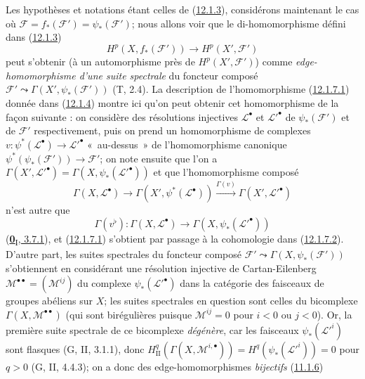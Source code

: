 \begin{env}[12.1.7]
\label{0.12.1.7-fr}
Les hypothèses et notations étant celles de
(\hyperref[0.12.1.3-fr]{12.1.3}), considérons maintenant le cas où
$\mathcal F=f_*(\mathcal F')=\psi_*(\mathcal F')$; nous allons voir que le
di-homomorphisme défini dans (\hyperref[0.12.1.3-fr]{12.1.3})
\[
\label{0.12.1.7.1-fr}
\tag{12.1.7.1}
H^p(X,f_*(\mathcal F'))\longrightarrow H^p(X',\mathcal F')
\]
peut s'obtenir (à un automorphisme près de $H^p(X',\mathcal F')$) comme
\emph{edge-homomorphisme d'une suite spectrale} du foncteur composé
$\mathcal F'\leadsto\Gamma(X',\psi_*(\mathcal F'))$ (T, 2.4). La description
de l'homomorphisme (\hyperref[0.12.1.7.1-fr]{12.1.7.1}) donnée dans
(\hyperref[0.12.1.4-fr]{12.1.4}) montre ici qu'on peut obtenir cet
homomorphisme de la façon suivante : on considère des résolutions injectives
$\mathcal L^\bullet$ et $\mathcal L'^\bullet$ de $\psi_*(\mathcal F')$ et de
$\mathcal F'$ respectivement, puis on prend un homomorphisme de complexes
$v:\psi^*(\mathcal L^\bullet)\to\mathcal L'^\bullet$ «~au-dessus~» de
l'homomorphisme canonique $\psi^*(\psi_*(\mathcal F'))\to\mathcal F'$;
on note ensuite que l'on a
$\Gamma(X',\mathcal L'^\bullet)=\Gamma(X,\psi_*(\mathcal L'^\bullet))$ et
que l'homomorphisme composé
\[
\Gamma(X,\mathcal L^\bullet)\longrightarrow
\Gamma(X',\psi^*(\mathcal L^\bullet))
\xrightarrow{\Gamma(v)}\Gamma(X',\mathcal L'^\bullet)
\]
n'est autre que
\[
\label{0.12.1.7.2-fr}
\tag{12.1.7.2}
\Gamma(v^\flat):\Gamma(X,\mathcal L^\bullet)
\longrightarrow\Gamma(X,\psi_*(\mathcal L'^\bullet))
\]
(\hyperref[0.3.7.1-fr]{\textbf{0}\textsubscript{I}, 3.7.1}), et
(\hyperref[0.12.1.7.1-fr]{12.1.7.1}) s'obtient par passage à la cohomologie
dans (\hyperref[0.12.1.7.2-fr]{12.1.7.2}). D'autre part, les suites spectrales
du foncteur composé $\mathcal F'\leadsto\Gamma(X,\psi_*(\mathcal F'))$
s'obtiennent en considérant une résolution injective de Cartan-Eilenberg
$\mathcal M^{\bullet\bullet}=(\mathcal M^{ij})$ du complexe
$\psi_*(\mathcal L'^\bullet)$ dans la catégorie des faisceaux de groupes
abéliens sur $X$; les suites spectrales en question sont celles du bicomplexe
$\Gamma(X,\mathcal M^{\bullet\bullet})$ (qui sont birégulières puisque
$\mathcal M^{ij}=0$ pour $i<0$ ou $j<0$). Or, la première suite spectrale de
ce bicomplexe \emph{dégénère}, car les faisceaux
$\psi_*(\mathcal L'^i)$ sont flasques (G, II, 3.1.1), donc
$H_{\mathrm{II}}^q(\Gamma(X,\mathcal M^{i,\bullet}))
=H^q(\psi_*(\mathcal L'^i))=0$ pour $q>0$ (G, II, 4.4.3); on a donc des
edge-homomorphismes \emph{bijectifs} (\hyperref[0.11.1.6-fr]{11.1.6})

\end{env}
